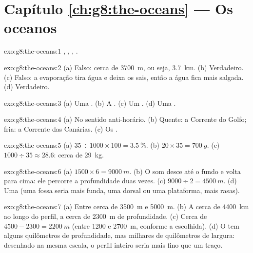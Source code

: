 \section*{Capítulo \ref{ch:g8:the-oceans} --- Os oceanos}

\begin{solution}{exo:g8:the-oceans:1}
, , , .
\end{solution}

\begin{solution}{exo:g8:the-oceans:2}
(a) Falso: cerca de \qty{3700}{m}, ou seja, \qty{3.7}{km}. (b) Verdadeiro.
(c) Falso: a evaporação tira água e deixa os sais, então a água fica mais
salgada. (d) Verdadeiro.
\end{solution}

\begin{solution}{exo:g8:the-oceans:3}
(a) Uma . (b) A . (c) Um . (d) Uma .
\end{solution}

\begin{solution}{exo:g8:the-oceans:4}
(a) No sentido anti-horário. (b) Quente: a Corrente do Golfo; fria: a
Corrente das Canárias. (c) Os .
\end{solution}

\begin{solution}{exo:g8:the-oceans:5}
(a) $35 \div 1000 \times 100 = 3.5~\%$. (b) $20 \times 35 = \qty{700}{g}$.
(c) $1000 \div 35 \approx 28.6$: cerca de \qty{29}{kg}.
\end{solution}

\begin{solution}{exo:g8:the-oceans:6}
(a) $1500 \times 6 = \qty{9000}{m}$. (b) O som desce até o fundo e volta
para cima: ele percorre a profundidade duas vezes. (c) $9000 \div 2 =
\qty{4500}{m}$. (d) Uma  (uma fossa seria mais funda, uma
dorsal ou uma plataforma, mais rasas).
\end{solution}

\begin{solution}{exo:g8:the-oceans:7}
(a) Entre cerca de \qty{3500}{m} e \qty{5000}{m}. (b) A cerca de \qty{4400}{km} ao longo do perfil, a cerca de \qty{2300}{m} de profundidade. (c) Cerca de
$4500 - 2300 = \qty{2200}{m}$ (entre 1200 e \qty{2700}{m}, conforme a
 escolhida). (d) O  tem alguns quilômetros de profundidade,
mas milhares de quilômetros de largura: desenhado na mesma escala, o
perfil inteiro seria mais fino que um traço.
\end{solution}

